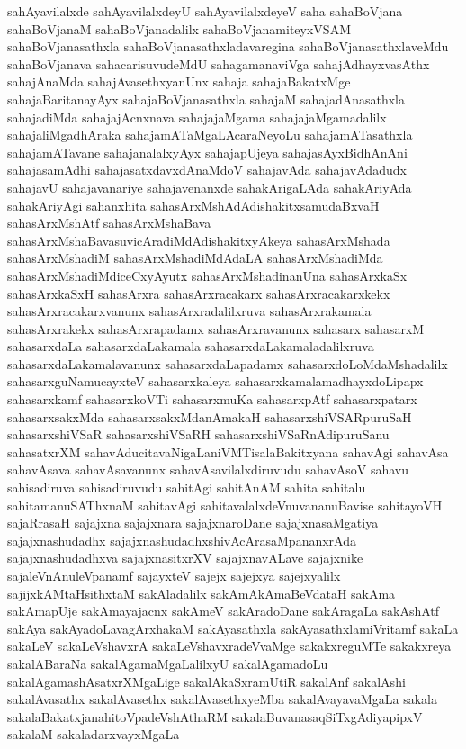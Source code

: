 {sahAyavilalxde
sahAyavilalxdeyU
sahAyavilalxdeyeV
saha
sahaBoVjana
sahaBoVjanaM
sahaBoVjanadalilx
sahaBoVjanamiteyxVSAM
sahaBoVjanasathxla
sahaBoVjanasathxladavaregina
sahaBoVjanasathxlaveMdu
sahaBoVjanava
sahacarisuvudeMdU
sahagamanaviVga
sahajAdhayxvasAthx
sahajAnaMda
sahajAvasethxyanUnx
sahaja
sahajaBakatxMge
sahajaBaritanayAyx
sahajaBoVjanasathxla
sahajaM
sahajadAnasathxla
sahajadiMda
sahajajAcnxnava
sahajajaMgama
sahajajaMgamadalilx
sahajaliMgadhAraka
sahajamATaMgaLAcaraNeyoLu
sahajamATasathxla
sahajamATavane
sahajanalalxyAyx
sahajapUjeya
sahajasAyxBidhAnAni
sahajasamAdhi
sahajasatxdavxdAnaMdoV
sahajavAda
sahajavAdadudx
sahajavU
sahajavanariye
sahajavenanxde
sahakArigaLAda
sahakAriyAda
sahakAriyAgi
sahanxhita
sahasArxMshAdAdishakitxsamudaBxvaH
sahasArxMshAtf
sahasArxMshaBava
sahasArxMshaBavasuvicAradiMdAdishakitxyAkeya
sahasArxMshada
sahasArxMshadiM
sahasArxMshadiMdAdaLA
sahasArxMshadiMda
sahasArxMshadiMdiceCxyAyutx
sahasArxMshadinanUna
sahasArxkaSx
sahasArxkaSxH
sahasArxra
sahasArxracakarx
sahasArxracakarxkekx
sahasArxracakarxvanunx
sahasArxradalilxruva
sahasArxrakamala
sahasArxrakekx
sahasArxrapadamx
sahasArxravanunx
sahasarx
sahasarxM
sahasarxdaLa
sahasarxdaLakamala
sahasarxdaLakamaladalilxruva
sahasarxdaLakamalavanunx
sahasarxdaLapadamx
sahasarxdoLoMdaMshadalilx
sahasarxguNamucayxteV
sahasarxkaleya
sahasarxkamalamadhayxdoLipapx
sahasarxkamf
sahasarxkoVTi
sahasarxmuKa
sahasarxpAtf
sahasarxpatarx
sahasarxsakxMda
sahasarxsakxMdanAmakaH
sahasarxshiVSARpuruSaH
sahasarxshiVSaR
sahasarxshiVSaRH
sahasarxshiVSaRnAdipuruSanu
sahasatxrXM
sahavAducitavaNigaLaniVMTisalaBakitxyana
sahavAgi
sahavAsa
sahavAsava
sahavAsavanunx
sahavAsavilalxdiruvudu
sahavAsoV
sahavu
sahisadiruva
sahisadiruvudu
sahitAgi
sahitAnAM
sahita
sahitalu
sahitamanuSAThxnaM
sahitavAgi
sahitavalalxdeVnuvananuBavise
sahitayoVH
sajaRrasaH
sajajxna
sajajxnara
sajajxnaroDane
sajajxnasaMgatiya
sajajxnashudadhx
sajajxnashudadhxshivAcArasaMpananxrAda
sajajxnashudadhxva
sajajxnasitxrXV
sajajxnavALave
sajajxnike
sajaleVnAnuleVpanamf
sajayxteV
sajejx
sajejxya
sajejxyalilx
sajijxkAMtaHsithxtaM
sakAladalilx
sakAmAkAmaBeVdataH
sakAma
sakAmapUje
sakAmayajacnx
sakAmeV
sakAradoDane
sakAragaLa
sakAshAtf
sakAya
sakAyadoLavagArxhakaM
sakAyasathxla
sakAyasathxlamiVritamf
sakaLa
sakaLeV
sakaLeVshavxrA
sakaLeVshavxradeVvaMge
sakakxreguMTe
sakakxreya
sakalABaraNa
sakalAgamaMgaLalilxyU
sakalAgamadoLu
sakalAgamashAsatxrXMgaLige
sakalAkaSxramUtiR
sakalAnf
sakalAshi
sakalAvasathx
sakalAvasethx
sakalAvasethxyeMba
sakalAvayavaMgaLa
sakala
sakalaBakatxjanahitoVpadeVshAthaRM
sakalaBuvanasaqSiTxgAdiyapipxV
sakalaM
sakaladarxvayxMgaLa
}
